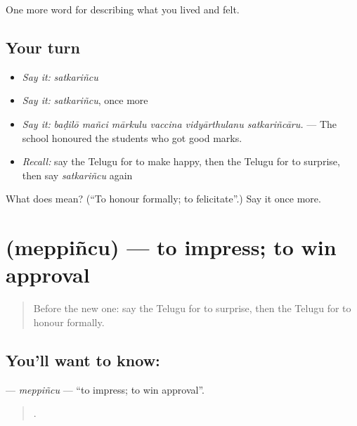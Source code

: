 \begin{grammarlens}[title={What you've built}]
One more word for describing what you lived and felt.
\end{grammarlens}

\subsection*{Your turn}
\begin{itemize}
\raggedright
  \item \emph{Say it:} \emph{satkariñcu}
  \item \emph{Say it:} \emph{satkariñcu}, once more
  \item \emph{Say it:} \emph{baḍilō mañci mārkulu vaccina vidyārthulanu satkariñcāru.} — The school honoured the students who got good marks.
  \item \emph{Recall:} say the Telugu for to make happy, then the Telugu for to surprise, then say \emph{satkariñcu} again
\end{itemize}

\begin{tcolorbox}[breakable,colback=teal!4,colframe=teal!35!black,title={Before you move on}]
What does  mean? (\textquotedblleft{}To honour formally; to felicitate\textquotedblright{}.) Say it once more.
\end{tcolorbox}
\section[\texorpdfstring{\te{మెప్పించు} (meppiñcu)}{మెప్పించు (meppiñcu)}]{ (meppiñcu) — to impress; to win approval}

\label{lesson:TE-C501-meppincu}



\begin{quote}
Before the new one: say the Telugu for to surprise, then the Telugu for to honour formally.
\end{quote}

\subsection*{You'll want to know: }
\textbf{} — \emph{meppiñcu} — \textquotedblleft{}to impress; to win approval\textquotedblright{}.

\begin{quote}
     .
\end{quote}

